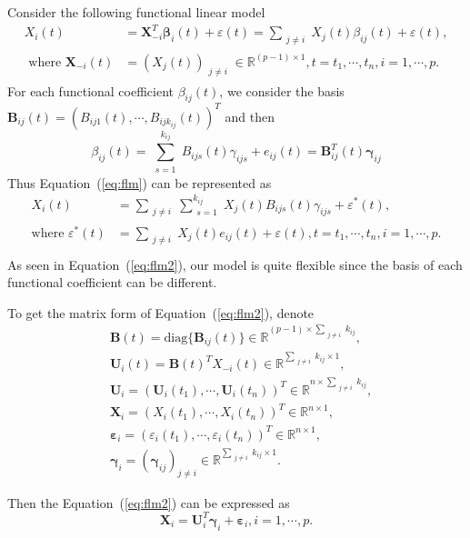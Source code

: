 \documentclass[11pt]{article}
\newcommand{\R}{\mathbb R}
\newcommand{\bX}{\mathbf X}
\newcommand{\bB}{\mathbf B}
\newcommand{\bU}{\mathbf U}
\newcommand{\bbeta}{{\boldsymbol{\beta}}}
\newcommand{\bvarepsilon}{\boldsymbol{\varepsilon}}
\newcommand{\bgamma}{\boldsymbol{\gamma}}
\begin{document}
Consider the following functional linear model
\begin{equation} 	\label{eq:flm}
    \begin{aligned}
    X_i(t) &= \bX_{-i}^T \bbeta_i(t) + \varepsilon(t) = \sum_{\substack{j\neq i}} X_j(t) \beta_{ij}(t) + \varepsilon(t),\\
    \text{ where }\bX_{-i}(t) &= (X_j(t))_{\substack{j \neq i}} \in \R^{(p-1) \times 1}, t = t_1, \cdots, t_n, i = 1, \cdots, p.
    \end{aligned}
\end{equation}
For each functional coefficient $\beta_{ij}(t)$, we consider the basis $\bB_{ij}(t) = (B_{ij1}(t), \cdots, B_{ijk_{ij}}(t) )^T$ and then 
$$\beta_{ij}(t) = \sum_{\substack{s=1}}^{k_{ij}} B_{ijs}(t) \gamma_{ijs} + e_{ij}(t) = \bB_{ij}^T(t) \bgamma_{ij} $$
Thus Equation~(\ref{eq:flm}) can be represented as
\begin{equation}
	\label{eq:flm2}
	\begin{aligned}
	X_i(t) &= \sum_{\substack{j \neq i}} \sum_{\substack{s=1}}^{k_{ij}} X_j(t) B_{ijs}(t) \gamma_{ijs} + \varepsilon^*(t), \\
	\text{where } \varepsilon^*(t) &= \sum_{\substack{j \neq i}} X_j(t)e_{ij}(t) + \varepsilon(t), t = t_1, \cdots, t_n, i = 1, \cdots, p.\\
	\end{aligned}
\end{equation}
As seen in Equation~(\ref{eq:flm2}), our model is quite flexible since the basis of each functional coefficient can be different.

To get the matrix form of Equation~(\ref{eq:flm2}), denote 
\begin{align*}
	&\bB(t) = \text{diag}\{\bB_{ij}(t)\} \in \R^{(p-1)\times \sum_{\substack{j \neq i}}k_{ij} },\\
	&\bU_i(t) = \bB(t)^T X_{-i}(t) \in \R^{ \sum_{\substack{j \neq i}}k_{ij} \times 1},\\
	&\bU_i = ( \bU_i(t_1), \cdots, \bU_i(t_n) )^T \in \R^{n \times \sum_{\substack{j \neq i}}k_{ij}},\\
	&\bX_i = (X_i(t_1), \cdots, X_i(t_n))^T \in \R^{n \times 1},\\
	&\bvarepsilon_i = (\varepsilon_i(t_1), \cdots, \varepsilon_i(t_n))^T \in \R^{n \times 1},\\
	&\bgamma_i = (\bgamma_{ij})_{j \neq i} \in \R^{\sum_{\substack{j \neq i}}k_{ij} \times 1}.
\end{align*}

Then the Equation~(\ref{eq:flm2}) can be expressed as
\begin{equation}
	\label{eq:flm3}
	\bX_i = \bU_i^T \bgamma_i + \bvarepsilon_i, i = 1, \cdots, p.
\end{equation}
 
\end{document}
